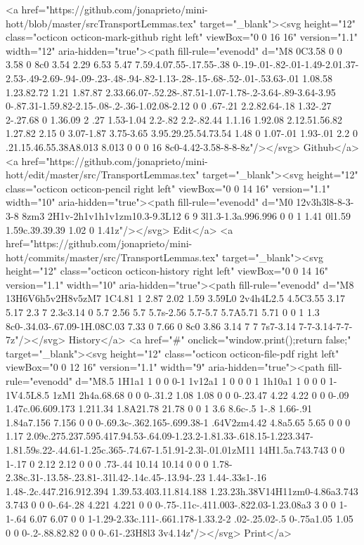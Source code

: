 {{      <a href="https://github.com/jonaprieto/mini-hott/blob/master/srcTransportLemmas.tex" target="_blank"><svg height="12" class="octicon octicon-mark-github right left" viewBox="0 0 16 16" version="1.1" width="12" aria-hidden="true"><path fill-rule="evenodd" d="M8 0C3.58 0 0 3.58 0 8c0 3.54 2.29 6.53 5.47 7.59.4.07.55-.17.55-.38 0-.19-.01-.82-.01-1.49-2.01.37-2.53-.49-2.69-.94-.09-.23-.48-.94-.82-1.13-.28-.15-.68-.52-.01-.53.63-.01 1.08.58 1.23.82.72 1.21 1.87.87 2.33.66.07-.52.28-.87.51-1.07-1.78-.2-3.64-.89-3.64-3.95 0-.87.31-1.59.82-2.15-.08-.2-.36-1.02.08-2.12 0 0 .67-.21 2.2.82.64-.18 1.32-.27 2-.27.68 0 1.36.09 2 .27 1.53-1.04 2.2-.82 2.2-.82.44 1.1.16 1.92.08 2.12.51.56.82 1.27.82 2.15 0 3.07-1.87 3.75-3.65 3.95.29.25.54.73.54 1.48 0 1.07-.01 1.93-.01 2.2 0 .21.15.46.55.38A8.013 8.013 0 0 0 16 8c0-4.42-3.58-8-8-8z"/></svg> Github</a>
      <a href="https://github.com/jonaprieto/mini-hott/edit/master/src/TransportLemmas.tex" target="_blank"><svg height="12" class="octicon octicon-pencil right left" viewBox="0 0 14 16" version="1.1" width="10" aria-hidden="true"><path fill-rule="evenodd" d="M0 12v3h3l8-8-3-3-8 8zm3 2H1v-2h1v1h1v1zm10.3-9.3L12 6 9 3l1.3-1.3a.996.996 0 0 1 1.41 0l1.59 1.59c.39.39.39 1.02 0 1.41z"/></svg> Edit</a>
      <a href="https://github.com/jonaprieto/mini-hott/commits/master/src/TransportLemmas.tex" target="_blank"><svg height="12" class="octicon octicon-history right left" viewBox="0 0 14 16" version="1.1" width="10" aria-hidden="true"><path fill-rule="evenodd" d="M8 13H6V6h5v2H8v5zM7 1C4.81 1 2.87 2.02 1.59 3.59L0 2v4h4L2.5 4.5C3.55 3.17 5.17 2.3 7 2.3c3.14 0 5.7 2.56 5.7 5.7s-2.56 5.7-5.7 5.7A5.71 5.71 0 0 1 1.3 8c0-.34.03-.67.09-1H.08C.03 7.33 0 7.66 0 8c0 3.86 3.14 7 7 7s7-3.14 7-7-3.14-7-7-7z"/></svg> History</a>
      <a  href="#" onclick="window.print();return false;" target="_blank"><svg height="12" class="octicon octicon-file-pdf right left" viewBox="0 0 12 16" version="1.1" width="9" aria-hidden="true"><path fill-rule="evenodd" d="M8.5 1H1a1 1 0 0 0-1 1v12a1 1 0 0 0 1 1h10a1 1 0 0 0 1-1V4.5L8.5 1zM1 2h4a.68.68 0 0 0-.31.2 1.08 1.08 0 0 0-.23.47 4.22 4.22 0 0 0-.09 1.47c.06.609.173 1.211.34 1.8A21.78 21.78 0 0 1 3.6 8.6c-.5 1-.8 1.66-.91 1.84a7.156 7.156 0 0 0-.69.3c-.362.165-.699.38-1 .64V2zm4.42 4.8a5.65 5.65 0 0 0 1.17 2.09c.275.237.595.417.94.53-.64.09-1.23.2-1.81.33-.618.15-1.223.347-1.81.59s.22-.44.61-1.25c.365-.74.67-1.51.91-2.3l-.01.01zM11 14H1.5a.743.743 0 0 1-.17 0 2.12 2.12 0 0 0 .73-.44 10.14 10.14 0 0 0 1.78-2.38c.31-.13.58-.23.81-.31l.42-.14c.45-.13.94-.23 1.44-.33s1-.16 1.48-.2c.447.216.912.394 1.39.53.403.11.814.188 1.23.23h.38V14H11zm0-4.86a3.743 3.743 0 0 0-.64-.28 4.221 4.221 0 0 0-.75-.11c-.411.003-.822.03-1.23.08a3 3 0 0 1-1-.64 6.07 6.07 0 0 1-1.29-2.33c.111-.661.178-1.33.2-2 .02-.25.02-.5 0-.75a1.05 1.05 0 0 0-.2-.88.82.82 0 0 0-.61-.23H8l3 3v4.14z"/></svg> Print</a>
}}
